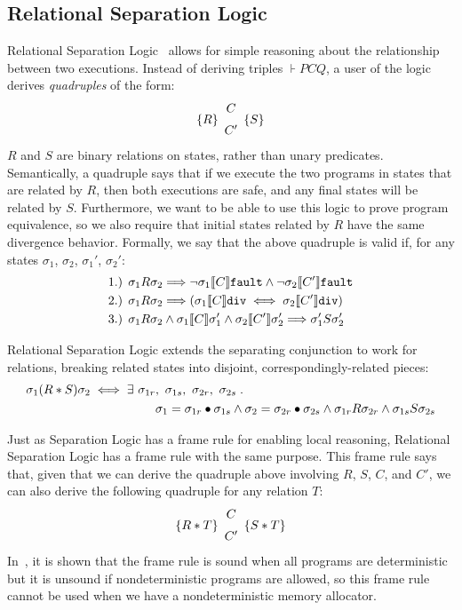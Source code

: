 \subsection{Relational Separation Logic}
\label{ssec:relationalsl}

Relational Separation Logic~\cite{yang07} allows for simple reasoning about the relationship between two executions.
Instead of deriving triples $\assert{P}{C}{Q}$, a user of the logic derives \emph{quadruples} of the form:
\[\rassert{R}{C}{C'}{S}\]
$R$ and $S$ are binary relations on states, rather than unary predicates. 
Semantically, a quadruple says that if we execute the two programs in states that are related by $R$, then
both executions are safe, and any final states will be related by $S$. Furthermore,
we want to be able to use this logic to prove program equivalence, so we also require that initial states
related by $R$ have the same divergence behavior. Formally, we say that the above quadruple is valid if,
for any states $\sigma_1$, $\sigma_2$, $\sigma_1'$, $\sigma_2'$:
\begin{align*}
& \text{1.) } \relate{R}{\sigma_1}{\sigma_2} \Longrightarrow 
\lnot \relate{\den{C}}{\sigma_1}{\fault} \land \lnot \relate{\den{C'}}{\sigma_2}{\fault} \\
& \text{2.) } \relate{R}{\sigma_1}{\sigma_2} \Longrightarrow 
(\relate{\den{C}}{\sigma_1}{\dvg} \iff \relate{\den{C'}}{\sigma_2}{\dvg}) \\
& \text{3.) } \relate{R}{\sigma_1}{\sigma_2} \land \relate{\den{C}}{\sigma_1}{\sigma_1'} \land \relate{\den{C'}}{\sigma_2}{\sigma_2'} 
\Longrightarrow \relate{S}{\sigma_1'}{\sigma_2'}
\end{align*}

Relational Separation Logic extends the separating conjunction to work for relations, breaking related 
states into disjoint, correspondingly-related pieces:
\begin{align*}
\relate{(R*S)}{\sigma_1}{\sigma_2} \iff \exists\ \sigma_{1r}&,\ \sigma_{1s},\ \sigma_{2r},\ \sigma_{2s} \such \\
& \sigma_1 = \sigma_{1r} \dt \sigma_{1s} \land \sigma_2 = \sigma_{2r} \dt \sigma_{2s} \land \relate{R}{\sigma_{1r}}{\sigma_{2r}} \land \relate{S}{\sigma_{1s}}{\sigma_{2s}}
\end{align*}

Just as Separation Logic has a frame rule for enabling local reasoning, Relational Separation Logic
has a frame rule with the same purpose. This frame rule says that, given that we can derive the 
quadruple above involving $R$, $S$, $C$, and $C'$, we can also derive the following quadruple for
any relation $T$:
\[\rassert{R*T}{C}{C'}{S*T}\]
In~\cite{yang07}, it is shown that the frame rule is sound when all programs are deterministic but it is unsound
if nondeterministic programs are allowed, so 
this frame rule cannot be used
when we have a nondeterministic memory allocator.

